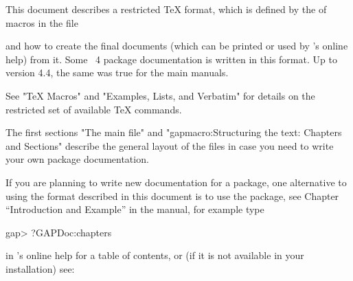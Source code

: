 
\OneColumnTableOfContents
\FrontMatter
%

\Chapters


This document describes a restricted {\TeX} format,
which is defined by the of macros in the file 


and how to create the final documents (which can be printed or used by
{\GAP}'s online help) from it.
Some {\GAP}~4 package documentation is written in this format.
Up to version 4.4, the same was true for the main {\GAP} manuals.

See "TeX Macros" and "Examples, Lists, and Verbatim" for details  on  the
restricted set of available {\TeX} commands.

The first sections "The main file" and
"gapmacro:Structuring the text: Chapters and Sections" describe
the  general  layout of the  files  in case  you need to   write your own
package documentation.

If you are planning to write new documentation for a {\GAP} package,
one alternative to using the format described in this document 
is to use the  package,
see Chapter ``Introduction and Example''
in the  manual,
for example type

\testexamplefalse
\beginexample
gap> ?GAPDoc:chapters
\endexample

in {\GAP}'s online help for a  table  of  contents,  or  (if  it  is  not
available in your installation) see:

